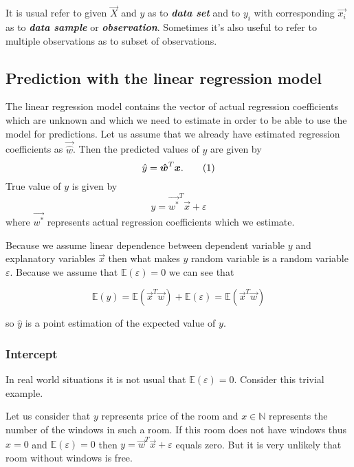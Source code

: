 \begin{note}
    It is usual refer to given $\vec{X}$ and $y$ as to \textbf{\textit{data set}} and to $y_i$ with corresponding $\vec{x_i}$ as to \textbf{\textit{data sample}} or \textbf{\textit{observation}}. Sometimes it's also useful to refer to multiple observations as to subset of observations.
\end{note}

\subsection{Prediction with the linear regression model}
The linear regression model contains the vector of actual regression coefficients which are unknown and which we need to estimate in order to be able to use the model for predictions. Let us assume that we already have estimated regression coefficients as $\vec{\hat{w}}$. Then the predicted values of $y$ are given by
\begin{equation}
    \hat{y} = \vec{\hat{w}}^T\vec{x}. \numberthis
\end{equation}
True value of $y$ is given by 
\begin{equation}
    y = \vec{w^{*}}^T\vec{x} + \varepsilon
\end{equation}
where $ \vec{w^{*}}$  represents actual regression coefficients which we estimate. 

Because we assume linear dependence between dependent variable $y$ and explanatory variables $\vec{x}$ then what makes $y$ random variable is a random variable $\varepsilon$. Because we assume that $\mathbb{E}(\varepsilon) = 0$ we can see that 

\begin{equation} \label{equation:vary}
\mathbb{E}(y) =\mathbb{E}(\vec{x}^T\vec{w}) + \mathbb{E}(\varepsilon) = \mathbb{E}(\vec{x}^T\vec{w})
\end{equation}

so $\hat{y}$ is a point estimation of the expected value of $y$.

\subsubsection{Intercept}
In real world situations it is not usual that $\mathbb{E}(\varepsilon) = 0$. Consider this trivial example.
\begin{example} \label{example:intercept}
Let us consider that $y$ represents price of the room and $x \in \mathbb{N}$ represents the number of the windows in such a room. If this room does not have windows thus $x = 0$ and $\mathbb{E}(\varepsilon) = 0$ then $ y = \vec{w}^T\vec{x} + \varepsilon$ equals zero. But it is very unlikely that room without windows is free. 
\end{example}

